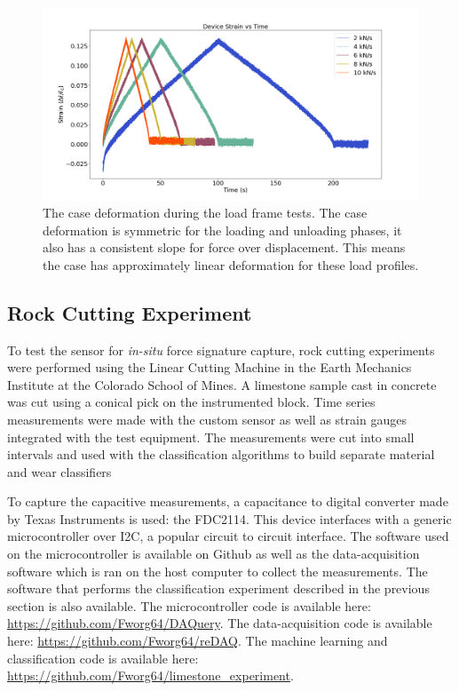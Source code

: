 \begin{figure}[t!]
\centering
\centerline{\includegraphics[width=5.5in]{figures/p1_media/Fig5.png}}
\caption{
The case deformation during the load frame tests. The case deformation is symmetric for the 
 loading and unloading phases, it also has a consistent slope for force over displacement.
This means the case has approximately linear deformation for these load profiles.
}
\label{fig:casedeformation}
\end{figure}

\subsection{Rock Cutting Experiment}

To test the sensor for \textit{in-situ} force signature capture, rock cutting experiments
 were performed using the Linear Cutting Machine in the Earth Mechanics Institute at the 
 Colorado School of Mines.
A limestone sample cast in concrete was cut using a conical pick
 on the instrumented block. 
Time series measurements were made with the custom sensor as well as
 strain gauges integrated with the test equipment. 
The measurements were cut into small intervals and used with the classification 
 algorithms to build separate material and wear classifiers


To capture the capacitive measurements, a capacitance to digital converter made by
Texas Instruments is used: the FDC2114. This device interfaces with a generic 
microcontroller over I2C, a popular circuit to circuit interface. The software
used on the microcontroller is available on Github as well as the data-acquisition software
which is ran on the host computer to collect the measurements.
The software that performs the classification experiment described in the previous section is also available.
The microcontroller code is available here:  \url{https://github.com/Fworg64/DAQuery}.
The data-acquisition code is available here: \url{https://github.com/Fworg64/reDAQ}.
The machine learning and classification code is available here: 
\url{https://github.com/Fworg64/limestone_experiment}.


